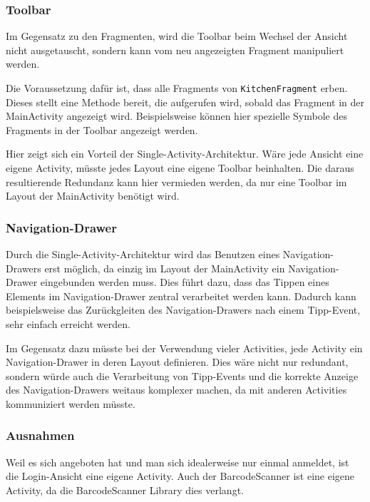 
\subsubsection{Toolbar}

Im Gegensatz zu den Fragmenten, wird die Toolbar beim Wechsel der Ansicht nicht ausgetauscht, sondern kann vom neu angezeigten Fragment manipuliert werden.

Die Voraussetzung dafür ist, dass alle Fragments von \texttt{KitchenFragment} erben.
Dieses stellt eine Methode bereit, die aufgerufen wird, sobald das Fragment in der MainActivity angezeigt wird.
Beispielsweise können hier spezielle Symbole des Fragments in der Toolbar angezeigt werden.

Hier zeigt sich ein Vorteil der Single-Activity-Architektur.
Wäre jede Ansicht eine eigene Activity, müsste jedes Layout eine eigene Toolbar beinhalten.
Die daraus resultierende Redundanz kann hier vermieden werden, da nur eine Toolbar im Layout der MainActivity benötigt wird.

\subsubsection{Navigation-Drawer}

Durch die Single-Activity-Architektur wird das Benutzen eines Navigation-Drawers erst möglich, da einzig im Layout der MainActivity ein Navigation-Drawer eingebunden werden muss.
Dies führt dazu, dass das Tippen eines Elements im Navigation-Drawer zentral verarbeitet werden kann.
Dadurch kann beispielsweise das Zurückgleiten des Navigation-Drawers nach einem Tipp-Event, sehr einfach erreicht werden.

Im Gegensatz dazu müsste bei der Verwendung vieler Activities, jede Activity ein Navigation-Drawer in deren Layout definieren.
Dies wäre nicht nur redundant, sondern würde auch die Verarbeitung von Tipp-Events und die korrekte Anzeige des Navigation-Drawers weitaus komplexer machen, da mit anderen Activities kommuniziert werden müsste.

\subsubsection{Ausnahmen}

Weil es sich angeboten hat und man sich idealerweise nur einmal anmeldet, ist die Login-Ansicht eine eigene Activity.
Auch der BarcodeScanner ist eine eigene Activity, da die BarcodeScanner Library dies verlangt.

